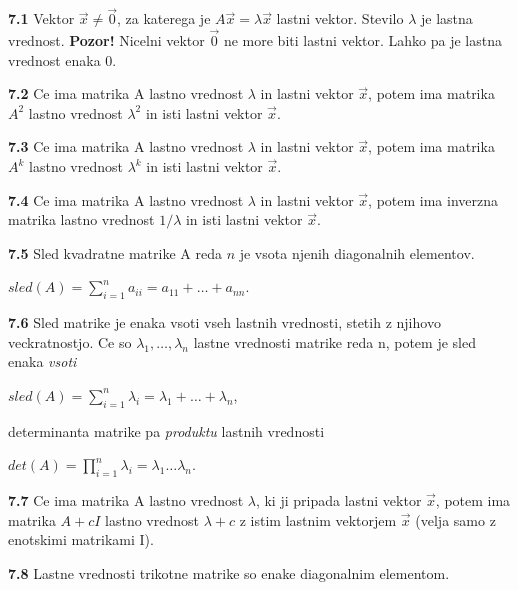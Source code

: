 \documentclass{article}
\begin{document}
\begin{multicols}{4}
\textbf{7.1} Vektor $\vec{x} \neq \vec{0}$, za katerega je $A\vec{x} = \lambda \vec{x}$ lastni vektor. Stevilo
$\lambda$ je lastna vrednost.
\textbf{Pozor!} Nicelni vektor $\vec{0}$ ne more biti lastni vektor. Lahko pa je lastna vrednost enaka 0.

\textbf{7.2} Ce ima matrika A lastno vrednost $\lambda$ in lastni vektor $\vec{x}$, potem ima matrika
$A^{2}$ lastno vrednost $\lambda^{2}$ in isti lastni vektor $\vec{x}$.

\textbf{7.3} Ce ima matrika A lastno vrednost $\lambda$ in lastni vektor $\vec{x}$, potem ima
matrika $A^{k}$ lastno vrednost $\lambda^{k}$ in isti lastni vektor $\vec{x}$.

\textbf{7.4} Ce ima matrika A lastno vrednost $\lambda$ in lastni vektor $\vec{x}$, potem ima
inverzna matrika lastno vrednost $1 / \lambda$ in isti lastni vektor $\vec{x}$.

\textbf{7.5} Sled kvadratne matrike A reda $n$ je vsota njenih diagonalnih elementov.
\begin{center}
    \begin{math}
        sled(A) =
        \sum_{i=1}^{n} a_{ii} =
        a_{11} + \dots + a_{nn}
    \end{math}.
\end{center}

\textbf{7.6} Sled matrike je enaka vsoti vseh lastnih vrednosti, stetih z njihovo veckratnostjo.
Ce so $\lambda_{1}, \dots, \lambda_{n}$ lastne vrednosti matrike reda n, potem je sled enaka \textit{vsoti}
\begin{center}
    \begin{math}
        sled(A) =
        \sum_{i=1}^{n} \lambda_{i} =
        \lambda_{1} + \dots + \lambda_{n}
    \end{math},
\end{center}
determinanta matrike pa \textit{produktu} lastnih vrednosti
\begin{center}
    \begin{math}
        det(A) =
        \prod_{i=1}^{n} \lambda_{i} =
        \lambda_{1} \dots  \lambda_{n}
    \end{math}.
\end{center}

\textbf{7.7} Ce ima matrika A lastno vrednost $\lambda$, ki ji pripada lastni vektor $\vec{x}$,
potem ima matrika $A + cI$ lastno vrednost $\lambda + c$ z istim lastnim vektorjem $\vec{x}$ (velja samo z
enotskimi matrikami I).

\textbf{7.8} Lastne vrednosti trikotne matrike so enake diagonalnim elementom.


\end{multicols}
\end{document}
